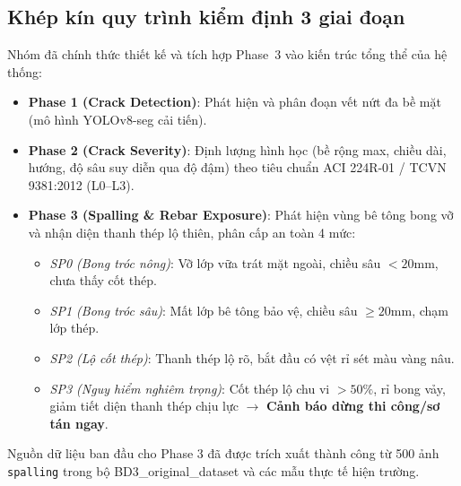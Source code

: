 \documentclass[12pt,a4paper]{article}
\begin{document}
\subsection{Khép kín quy trình kiểm định 3 giai đoạn}
Nhóm đã chính thức thiết kế và tích hợp Phase~3 vào kiến trúc tổng thể của hệ thống:
\begin{itemize}[leftmargin=*]
    \item \textbf{Phase 1 (Crack Detection)}: Phát hiện và phân đoạn vết nứt đa bề mặt (mô hình YOLOv8-seg cải tiến).
    \item \textbf{Phase 2 (Crack Severity)}: Định lượng hình học (bề rộng max, chiều dài, hướng, độ sâu suy diễn qua độ đậm) theo tiêu chuẩn ACI 224R-01 / TCVN 9381:2012 (L0--L3).
    \item \textbf{Phase 3 (Spalling \& Rebar Exposure)}: Phát hiện vùng bê tông bong vỡ và nhận diện thanh thép lộ thiên, phân cấp an toàn 4 mức:
    \begin{itemize}[leftmargin=*]
        \item \emph{SP0 (Bong tróc nông)}: Vỡ lớp vữa trát mặt ngoài, chiều sâu $< 20$mm, chưa thấy cốt thép.
        \item \emph{SP1 (Bong tróc sâu)}: Mất lớp bê tông bảo vệ, chiều sâu $\geq 20$mm, chạm lớp thép.
        \item \emph{SP2 (Lộ cốt thép)}: Thanh thép lộ rõ, bắt đầu có vệt rỉ sét màu vàng nâu.
        \item \emph{SP3 (Nguy hiểm nghiêm trọng)}: Cốt thép lộ chu vi $> 50\%$, rỉ bong vảy, giảm tiết diện thanh thép chịu lực $\rightarrow$ \textbf{Cảnh báo dừng thi công/sơ tán ngay}.
    \end{itemize}
\end{itemize}
Nguồn dữ liệu ban đầu cho Phase 3 đã được trích xuất thành công từ 500 ảnh \texttt{spalling} trong bộ BD3\_original\_dataset và các mẫu thực tế hiện trường.
\end{document}
